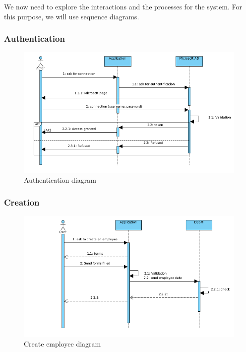 \documentclass[12pt,a4paper,table,english]{article}
\begin{document}
	We now need to explore the interactions and the processes for the system. For this purpose, we will use sequence diagrams.
	
	\subsubsection{Authentication}
	
		\begin{figure}[H]
		\includegraphics[width=150mm]{Image/seq-authentication}
		\caption{Authentication diagram}
		\label{fig:Authentication diagram}
		\end{figure}
	
	\subsubsection{Creation}
	
	\begin{figure}[H]
		\includegraphics[width=150mm]{Image/seq-createemp}
		\caption{Create employee diagram}
		\label{fig:Create employee diagram}
	\end{figure}
	
\end{document}
